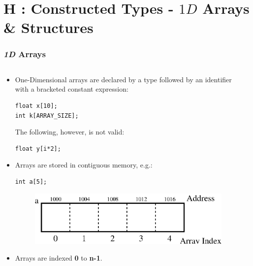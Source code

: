 \section{H : Constructed Types - $1D$ Arrays \& Structures }
\label{chap:contypes}

\begin{frame}[fragile]
\frametitle{{\em 1D} Arrays}

\begin{columns}

\begin{column}{0.55\textwidth}
\begin{itemize}[<+->]
\item One-Dimensional arrays are declared by a type
followed by an identifier with a bracketed constant expression:
{\small
\begin{verbatim}
float x[10];
int k[ARRAY_SIZE];
\end{verbatim}
}
The following, however, is not valid:
{\small
\begin{verbatim}
float y[i*2];
\end{verbatim}
}
\item Arrays are stored in contiguous memory, e.g.:
{\small
\begin{verbatim}
int a[5];
\end{verbatim}
}
\begin{center}
\begin{figure}[h]
\centerline{
\includegraphics[scale=0.40]{../Figs/array9_1.eps}
}
\end{figure}
\end{center}
\item Arrays are indexed {\bf 0} to {\bf n-1}.
\end{itemize}

\end{column}

\pause
\begin{column}{0.35\textwidth}

\end{column}

\end{columns}
\end{frame}

